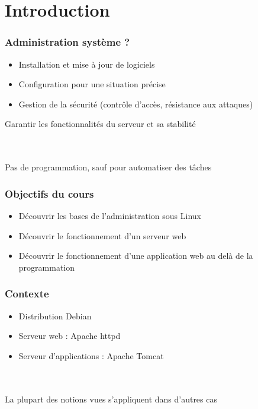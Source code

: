 \section*{Introduction}

\begin{frame}
	\frametitle{Administration système ?}
	
	\begin{itemize}
		\item Installation et mise à jour de logiciels
		\item Configuration pour une situation précise
		\item Gestion de la sécurité (contrôle d'accès, résistance aux attaques)
	\end{itemize}
    \Rightarrow Garantir les fonctionnalités du serveur et sa stabilité

    ~\\
	~\\	
	
	Pas de programmation, sauf pour automatiser des tâches

\end{frame}

\begin{frame}
	\frametitle{Objectifs du cours}
	
	\begin{itemize}
		\item Découvrir les bases de l'administration sous Linux
		\item Découvrir le fonctionnement d'un serveur web
		\item Découvrir le fonctionnement d'une application web au delà de la programmation
	\end{itemize}
\end{frame}

\begin{frame}
	\frametitle{Contexte}
	
	\begin{itemize}
		\item Distribution Debian
		\item Serveur web : Apache httpd
		\item Serveur d'applications : Apache Tomcat
	\end{itemize}
	
	~\\
	~\\	
	La plupart des notions vues s'appliquent dans d'autres cas
\end{frame}
